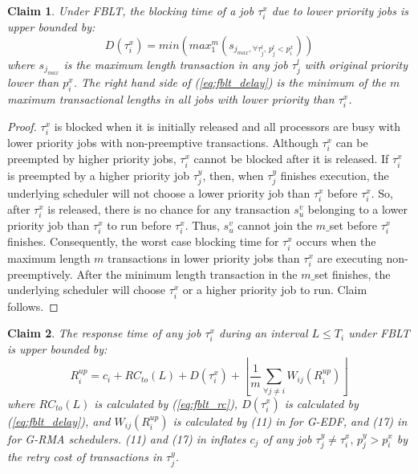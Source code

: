 \documentclass[prodmode,acmtecs]{acmsmall}
\newtheorem{clm}{Claim}
\begin{document}
\begin{compactenum}
\begin{clm}
Under FBLT, the blocking time of a job $\tau_{i}^{x}$ due to lower priority
jobs is upper bounded by: 
\begin{equation}
D(\tau_{i}^{x})=min\left(max_{1}^{m}(s_{j_{max},\forall\tau_{j}^{l},\, p_{j}^{l}<p_{i}^{x}})\right)\label{eq:fblt_delay}
\end{equation}
where $s_{j_{max}}$ is the maximum length transaction in any job
$\tau_{j}^{l}$ with original priority lower than $p_{i}^{x}$. The
right hand side of (\ref{eq:fblt_delay}) is the minimum of the $m$
maximum transactional lengths in all jobs with lower priority than
$\tau_{i}^{x}$.
\end{clm}


\begin{proof}
$\tau_{i}^{x}$ is blocked when it is initially released and all processors
are busy with lower priority jobs with non-preemptive transactions.
Although $\tau_{i}^{x}$ can be preempted by higher priority jobs,
$\tau_{i}^{x}$ cannot be blocked after it is released. If $\tau_{i}^{x}$
is preempted by a higher priority job $\tau_{j}^{y}$, then, when $\tau_{j}^{y}$
finishes execution, the underlying scheduler will not choose a lower
priority job than $\tau_{i}^{x}$ before $\tau_{i}^{x}$. So, after
$\tau_{i}^{x}$ is released, there is no chance for any transaction
$s_{u}^{v}$ belonging to a lower priority job than $\tau_{i}^{x}$
to run before $\tau_{i}^{x}$. Thus, $s_{u}^{v}$ cannot join the $m\_$set
before $\tau_{i}^{x}$ finishes. Consequently, the worst case blocking
time for $\tau_{i}^{x}$ occurs when the maximum length $m$ transactions
in lower priority jobs than $\tau_{i}^{x}$ are executing non-preemptively.
After the minimum length transaction in the $m\_$set finishes, the
underlying scheduler will choose $\tau_{i}^{x}$ or a higher priority
job to run. Claim follows.
\end{proof}

\begin{clm}
The response time of any job $\tau_{i}^{x}$ during an interval $L\le T_{i}$
under FBLT is upper bounded by:
\begin{equation}
R_{i}^{up}=c_{i}+RC_{to}(L)+D(\tau_{i}^{x})+\left\lfloor \frac{1}{m}\sum_{\forall j\ne i}W_{ij}(R_{i}^{up})\right\rfloor \label{eq:fblt_res_time}
\end{equation}
where $RC_{to}(L)$ is calculated by (\ref{eq:fblt_rc}), $D(\tau_{i}^{x})$
is calculated by (\ref{eq:fblt_delay}), and $W_{ij}(R_{i}^{up})$
is calculated by (11) in \cite{stmconcurrencycontrol:emsoft11} for
G-EDF, and (17) in \cite{stmconcurrencycontrol:emsoft11} for G-RMA schedulers.
(11) and (17) in \cite{stmconcurrencycontrol:emsoft11} inflates $c_{j}$
of any job $\tau_{j}^y\ne\tau_{i}^x,\, p_{j}^y>p_{i}^x$ by the retry cost
of transactions in $\tau_{j}^y$.
\end{clm}



\end{compactenum}
\end{document}
